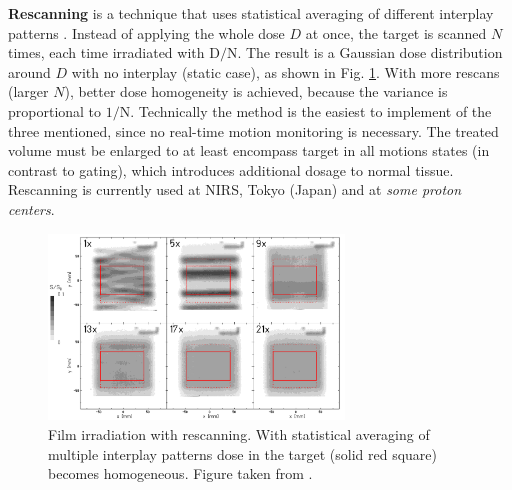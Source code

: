 \textbf{Rescanning} is a technique that uses statistical averaging of different interplay patterns \cite{Phillips1992}. Instead of applying the whole dose $D$ at once, the target is scanned $N$ times, each
time irradiated with $\mathrm{D}/\mathrm{N}$. The result is a Gaussian dose distribution around $D$ with no interplay (static case), as shown in Fig. \ref{rescanning}. With more rescans (larger $N$), better dose homogeneity is achieved, because the variance is proportional
to $\mathrm{1}/\mathrm{N}$. Technically the method is the easiest to implement of the three mentioned, since no real-time motion monitoring is necessary. The treated volume must be enlarged to at least encompass target in all motions states (in
contrast to gating), which introduces additional dosage to normal tissue. Rescanning is currently used at NIRS, Tokyo (Japan) and at \textit{some proton centers}.
\newline
\begin{figure}[H]
\begin{center}
\includegraphics[width=0.7\textwidth]{./Fundamentals/Images/rescanning.png}
\caption{Film irradiation with rescanning. With statistical averaging of multiple interplay patterns dose in the target (solid red square) becomes homogeneous. Figure taken from \cite{Bert2009}.}
\label{rescanning}
\end{center}
\end{figure}

